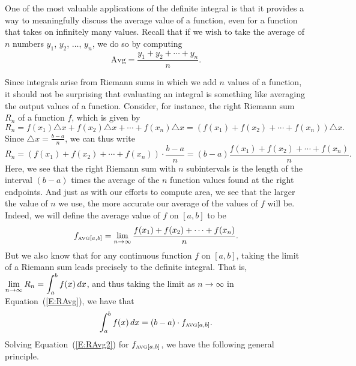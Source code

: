 One of the most valuable applications of the definite integral is that it provides a way to meaningfully discuss the average value of a function, even for a function that takes on infinitely many values.  Recall that if we wish to take the average of $n$ numbers $y_1$, $y_2$, $\ldots$, $y_n$, we do so by computing
$$\mbox{Avg} = \frac{y_1 + y_2 + \cdots + y_n}{n}.$$

Since integrals arise from Riemann sums in which we add $n$ values of a function, it should not be surprising that evaluating an integral is something like averaging the output values of a function.  Consider, for instance, the right Riemann sum $R_n$ of a function $f$, which is given by
$$R_n = f(x_1) \triangle x + f(x_2) \triangle x + \cdots + f(x_n) \triangle x = (f(x_1) + f(x_2) + \cdots + f(x_n))\triangle x.$$
Since $\triangle x = \frac{b-a}{n}$, we can thus write 
\begin{equation} \label{E:RAvg}
R_n = (f(x_1) + f(x_2) + \cdots + f(x_n))\cdot \frac{b-a}{n} = (b-a) \frac{f(x_1) + f(x_2) + \cdots + f(x_n)}{n}.
\end{equation}
Here, we see that the right Riemann sum with $n$ subintervals is the length of the interval $(b-a)$ times the average of the $n$ function values found at the right endpoints.  And just as with our efforts to compute area, we see that the larger the value of $n$ we use, the more accurate our average of the values of $f$ will be.  Indeed, we will define the average value of $f$ on $[a,b]$ to be 
$$f_{\mbox{\tiny{AVG}}[a,b]} = \lim_{n \to \infty} \frac{f(x_1) + f(x_2) + \cdots + f(x_n)}{n}.$$  But we also know that for any continuous function $f$ on $[a,b]$, taking the limit of a Riemann sum leads precisely to the definite integral.  That is, $\displaystyle \lim_{n \to \infty} R_n = \int_a^b f(x) \, dx$, and thus taking the limit as $n \to \infty$ in Equation~(\ref{E:RAvg}), we have that
\begin{equation} \label{E:RAvg2}
\int_a^b f(x) \, dx = (b-a) \cdot f_{\mbox{\tiny{AVG}}[a,b]}.
\end{equation}
Solving Equation~(\ref{E:RAvg2}) for $f_{\mbox{\tiny{AVG}}[a,b]}$, we have the following general principle.

\vspace*{5pt}
\nin {}
\vspace*{1pt}

